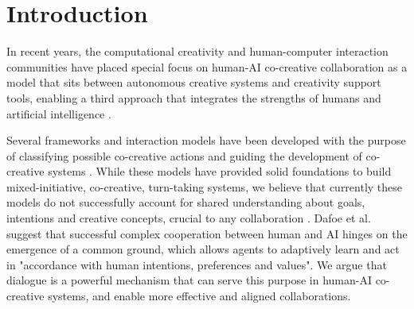 \documentclass[manuscript,review]{acmart}
\begin{document}




\maketitle

\section{Introduction}

In recent years, the computational creativity and human-computer interaction communities have placed special focus on human-AI co-creative collaboration as a model that sits between autonomous creative systems and creativity support tools, enabling a third approach that integrates the strengths of humans and artificial intelligence \cite{yannakakis2014mixed} \cite{mullermixed} \cite{kantosalo2016modes} \cite{Davis2013-jy}. 

Several frameworks and interaction models have been developed with the purpose of classifying possible co-creative actions and guiding the development of co-creative systems \cite{Rezwana_undated-dr, mullermixed, spoto17}. While these models have provided solid foundations to build mixed-initiative, co-creative, turn-taking systems, we believe that currently these models do not successfully account for shared understanding about goals, intentions and creative concepts, crucial to any collaboration \cite{Dafoe2021-in,Hoc2000-iy}. %
Dafoe et al. \cite{Dafoe2021-in} suggest that successful complex cooperation between human and AI hinges on the emergence of a common ground, which allows agents to adaptively learn and act in "accordance with human intentions, preferences and values". We argue that dialogue is a powerful mechanism that can serve this purpose in human-AI co-creative systems, and enable more effective and aligned collaborations.
\end{document}
